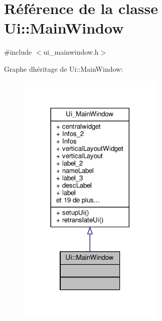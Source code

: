 \hypertarget{classUi_1_1MainWindow}{}\section{Référence de la classe Ui\+:\+:Main\+Window}
\label{classUi_1_1MainWindow}


{\ttfamily \#include $<$ui\+\_\+mainwindow.\+h$>$}



Graphe d\textquotesingle{}héritage de Ui\+:\+:Main\+Window\+:\nopagebreak
\begin{figure}[H]
\begin{center}
\leavevmode
\includegraphics[width=197pt]{classUi_1_1MainWindow__inherit__graph}
\end{center}
\end{figure}


